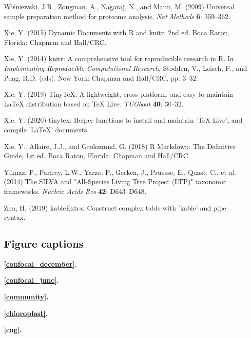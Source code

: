 \documentclass[12pt,]{article}
\begin{document}
\leavevmode\hypertarget{ref-Wisniewski2009}{}%
Wiśniewski, J.R., Zougman, A., Nagaraj, N., and Mann, M. (2009)
Universal sample preparation method for proteome analysis. \emph{Nat
Methods} \textbf{6}: 359--362.

\leavevmode\hypertarget{ref-Xie2015}{}%
Xie, Y. (2015) Dynamic Documents with R and knitr, 2nd ed. Boca Raton,
Florida: Chapman and Hall/CRC.

\leavevmode\hypertarget{ref-Xie2014}{}%
Xie, Y. (2014) knitr: A comprehensive tool for reproducible research in
R. In \emph{Implementing Reproducible Computational Research}. Stodden,
V., Leisch, F., and Peng, R.D. (eds). New York: Chapman and Hall/CRC,
pp. 3--32.

\leavevmode\hypertarget{ref-Xie2019a}{}%
Xie, Y. (2019) TinyTeX: A lightweight, cross-platform, and
easy-to-maintain LaTeX distribution based on TeX Live. \emph{TUGboat}
\textbf{40}: 30--32.

\leavevmode\hypertarget{ref-Xie2020}{}%
Xie, Y. (2020) tinytex: Helper functions to install and maintain 'TeX
Live', and compile 'LaTeX' documents.

\leavevmode\hypertarget{ref-Xie2018}{}%
Xie, Y., Allaire, J.J., and Grolemund, G. (2018) R Markdown: The
Definitive Guide, 1st ed. Boca Raton, Florida: Chapman and Hall/CRC.

\leavevmode\hypertarget{ref-Yilmaz2014}{}%
Yilmaz, P., Parfrey, L.W., Yarza, P., Gerken, J., Pruesse, E., Quast,
C., et al. (2014) The SILVA and "All-Species Living Tree Project (LTP)"
taxonomic frameworks. \emph{Nucleic Acids Res} \textbf{42}: D643--D648.

\leavevmode\hypertarget{ref-Zhu2019}{}%
Zhu, H. (2019) kableExtra: Construct complex table with 'kable' and pipe
syntax.

\newpage 
\setlength\parindent{0pt}

\hypertarget{figure-captions}{%
\subsection{Figure captions}\label{figure-captions}}

\textbf{\autoref{confocal_december}.} 

\textbf{\autoref{confocal_june}.} 

\textbf{\autoref{community}.} 

\textbf{\autoref{chloroplast}.} 

\textbf{\autoref{cog}.} 
\end{document}
